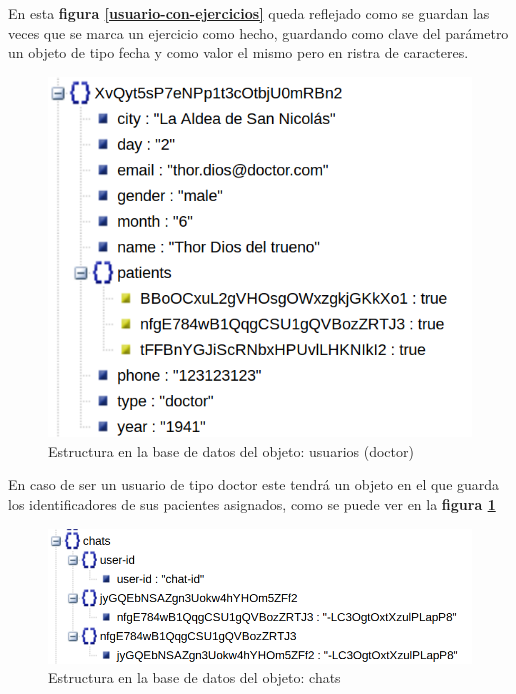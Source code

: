 En esta \textbf{figura \ref{usuario-con-ejercicios}} queda reflejado como
se guardan las veces que se marca un ejercicio como hecho, guardando como clave
del parámetro un objeto de tipo fecha y como valor el mismo pero en ristra de
caracteres.

\medskip
\begin{figure}
    \includegraphics[width=\linewidth]{./images/users-doctor-database.png}
    \caption{Estructura en la base de datos del objeto: usuarios (doctor)}
    \label{usuario-doctor}
\end{figure}

En caso de ser un usuario de tipo doctor este tendrá un objeto en el que
guarda los identificadores de sus pacientes asignados, como se puede ver
en la \textbf{figura \ref{usuario-doctor}}

\medskip
\begin{figure}
    \includegraphics[width=\linewidth]{./images/chats-database.png}
    \caption{Estructura en la base de datos del objeto: chats}
    \label{chat}
\end{figure}

